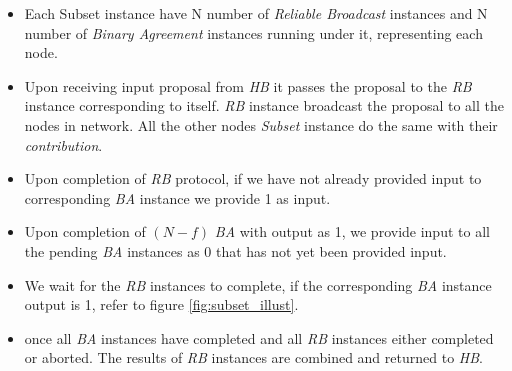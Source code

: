 \begin{itemize}
    \item Each Subset instance have N number of \textit{Reliable Broadcast} instances and N number of \textit{Binary Agreement} instances running under it, representing each node.
    \item Upon receiving input proposal from \textit{HB} it passes the proposal to the \textit{RB} instance corresponding to itself. \textit{RB} instance broadcast the proposal to all the nodes in network. All the other nodes \textit{Subset} instance do the same with their \textit{contribution}.
    \item Upon completion of \textit{RB} protocol, if we have not already provided input to corresponding \textit{BA} instance we provide 1 as input.
    \item Upon completion of $ (N-f) $ \textit{BA} with output as 1, we provide input to all the pending \textit{BA} instances as 0 that has not yet been provided input.
    \item We wait for the \textit{RB} instances to complete, if the corresponding \textit{BA} instance output is 1, refer to figure \ref{fig:subset_illust}.
    \item once all \textit{BA} instances have completed and all \textit{RB} instances either completed or aborted. The results of \textit{RB} instances are combined and returned to \textit{HB}.
\end{itemize}
